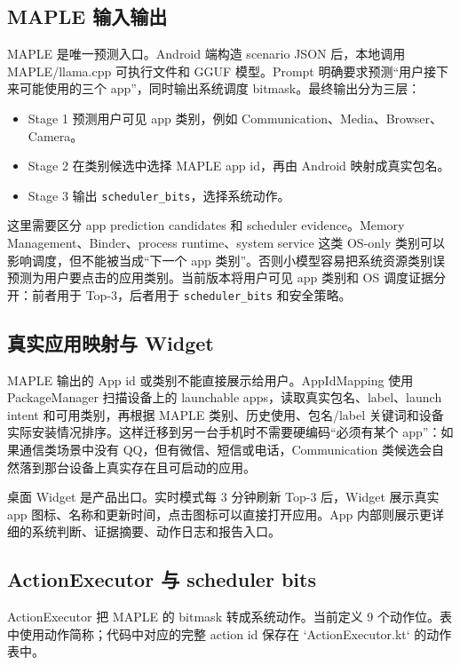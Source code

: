 \subsection{MAPLE 输入输出}

MAPLE 是唯一预测入口。Android 端构造 scenario JSON 后，本地调用 MAPLE/llama.cpp 可执行文件和 GGUF 模型。Prompt 明确要求预测“用户接下来可能使用的三个 app”，同时输出系统调度 bitmask。最终输出分为三层：

\begin{itemize}
  \item Stage 1 预测用户可见 app 类别，例如 Communication、Media、Browser、Camera。
  \item Stage 2 在类别候选中选择 MAPLE app id，再由 Android 映射成真实包名。
  \item Stage 3 输出 \texttt{scheduler\_bits}，选择系统动作。
\end{itemize}

这里需要区分 app prediction candidates 和 scheduler evidence。Memory Management、Binder、process runtime、system service 这类 OS-only 类别可以影响调度，但不能被当成“下一个 app 类别”。否则小模型容易把系统资源类别误预测为用户要点击的应用类别。当前版本将用户可见 app 类别和 OS 调度证据分开：前者用于 Top-3，后者用于 \texttt{scheduler\_bits} 和安全策略。

\subsection{真实应用映射与 Widget}

MAPLE 输出的 App id 或类别不能直接展示给用户。AppIdMapping 使用 PackageManager 扫描设备上的 launchable apps，读取真实包名、label、launch intent 和可用类别，再根据 MAPLE 类别、历史使用、包名/label 关键词和设备实际安装情况排序。这样迁移到另一台手机时不需要硬编码“必须有某个 app”：如果通信类场景中没有 QQ，但有微信、短信或电话，Communication 类候选会自然落到那台设备上真实存在且可启动的应用。

桌面 Widget 是产品出口。实时模式每 3 分钟刷新 Top-3 后，Widget 展示真实 app 图标、名称和更新时间，点击图标可以直接打开应用。App 内部则展示更详细的系统判断、证据摘要、动作日志和报告入口。

\subsection{ActionExecutor 与 scheduler bits}

ActionExecutor 把 MAPLE 的 bitmask 转成系统动作。当前定义 9 个动作位。表中使用动作简称；代码中对应的完整 action id 保存在 `ActionExecutor.kt` 的动作表中。

